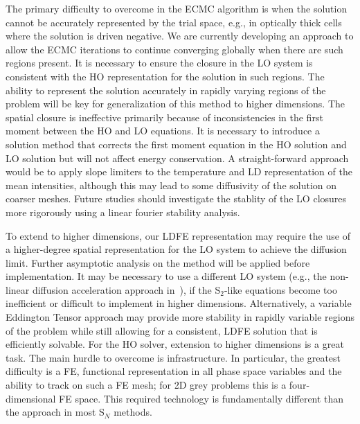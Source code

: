 The primary difficulty to overcome in the ECMC algorithm is when the solution cannot be
accurately represented by the trial space, e.g., in optically thick cells where the
solution is driven negative.   We are currently developing an approach to allow the ECMC
iterations to continue converging globally when there are such regions present.  It is
necessary to ensure the closure in the LO system is consistent with the HO representation
for the solution in such regions.  The ability to represent the solution accurately in
rapidly varying regions of the problem will be key for generalization of this method to
higher dimensions.  The spatial closure is ineffective primarily because of
inconsistencies in the first moment between the HO and LO equations.  It is necessary to
introduce a solution method that corrects the first moment equation in the HO solution and
LO solution but will not affect energy conservation.  A straight-forward approach would be
to apply slope limiters to the temperature and LD representation of the mean intensities,
although this may lead to some diffusivity of the solution on coarser meshes.  Future
studies should investigate the stablity of the LO closures more rigorously using a linear
fourier stability analysis. 

To extend to higher dimensions, our LDFE representation may require the use of a higher-degree
spatial representation for the LO system to achieve the diffusion
limit. Further asymptotic
analysis on the method will be applied before implementation. It may be necessary to use a different LO system (e.g., the non-linear diffusion
acceleration approach in~\cite{rmc}), if the S$_2$-like equations become too
inefficient or difficult to implement in higher dimensions.  Alternatively, a
variable Eddington Tensor approach may provide more stability in rapidly variable
regions of the problem while still allowing for a consistent, LDFE solution that is efficiently solvable.
For the HO solver, extension to higher dimensions is a great task.  The main hurdle to
overcome is infrastructure.  In particular, the greatest difficulty is a FE, functional
representation in all phase space variables and the ability to
track on such a FE mesh; for 2D grey problems this is a four-dimensional FE space.  This
required technology is fundamentally different than the approach in most S$_N$ methods.

